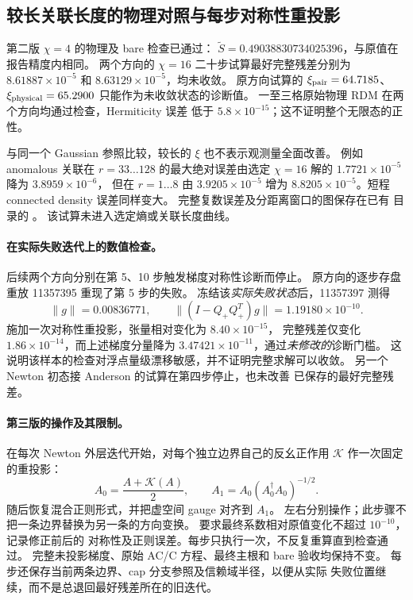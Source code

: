 \subsection{较长关联长度的物理对照与每步对称性重投影}
第二版 $\chi=4$ 的物理及 bare 检查已通过：
$\widetilde S=0.49038830734025396$，与原值在报告精度内相同。
两个方向的 $\chi=16$ 二十步试算最好完整残差分别为
$8.61887\times10^{-5}$ 和 $8.63129\times10^{-5}$，均未收敛。
原方向试算的 $\xi_{\rm pair}=64.7185$、
$\xi_{\rm physical}=65.2900$ 只能作为未收敛状态的诊断值。
一至三格原始物理 RDM 在两个方向均通过检查，Hermiticity 误差
低于 $5.8\times10^{-15}$；这不证明整个无限态的正性。

与同一个 Gaussian 参照比较，较长的 $\xi$ 也不表示观测量全面改善。
例如 anomalous 关联在 $r=33\ldots128$ 的最大绝对误差由选定
$\chi=16$ 解的 $1.7721\times10^{-5}$ 降为 $3.8959\times10^{-6}$，
但在 $r=1\ldots8$ 由 $3.9205\times10^{-5}$ 增为
$8.8205\times10^{-5}$。短程 connected density 误差同样变大。
完整复数误差及分距离窗口的图保存在已有 
目录的 。
该试算未进入选定熵或关联长度曲线。

\paragraph{在实际失败迭代上的数值检查。}
后续两个方向分别在第 5、10 步触发梯度对称性诊断而停止。
原方向的逐步存盘重放 11357395 重现了第 5 步的失败。
冻结该\emph{实际失败状态}后，11357397 测得
\begin{equation}
 \|g\|=0.00836771,\qquad
 \|(I-Q_+Q_+^T)g\|=1.19180\times10^{-10}.
\end{equation}
施加一次对称性重投影，张量相对变化为 $8.40\times10^{-15}$，
完整残差仅变化 $1.86\times10^{-14}$，而上述梯度分量降为
$3.47421\times10^{-11}$，通过\emph{未修改的}诊断门槛。
这说明该样本的检查对浮点量级漂移敏感，并不证明完整求解可以收敛。
另一个 Newton 初态接 Anderson 的试算在第四步停止，也未改善
已保存的最好完整残差。

\paragraph{第三版的操作及其限制。}
在每次 Newton 外层迭代开始，对每个独立边界自己的反幺正作用
$\mathcal K$ 作一次固定的重投影：
\begin{equation}
 A_0=\frac{A+\mathcal K(A)}{2},\qquad
 A_1=A_0(A_0^\dagger A_0)^{-1/2}.
\end{equation}
随后恢复混合正则形式，并把虚空间 gauge 对齐到 $A_1$。
左右分别操作；此步骤不把一条边界替换为另一条的方向变换。
要求最终系数相对原值变化不超过 $10^{-10}$，记录修正前后的
对称性及正则误差。每步只执行一次，不反复重算直到检查通过。
完整未投影梯度、原始 AC/C 方程、最终主根和 bare 验收均保持不变。
每步还保存当前两条边界、cap 分支参照及信赖域半径，以便从实际
失败位置继续，而不是总退回最好残差所在的旧迭代。

